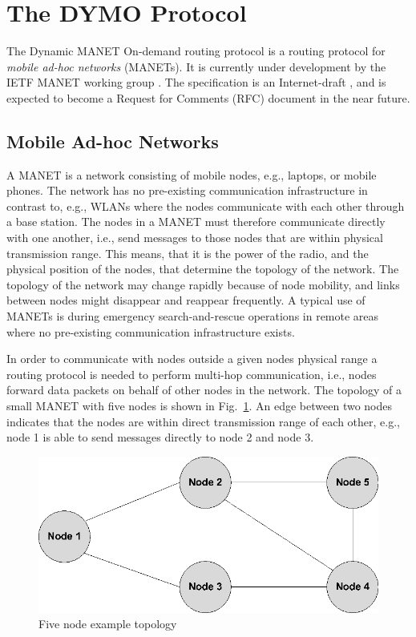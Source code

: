 \section{The DYMO Protocol}
\label{sec:dymooverview}
The Dynamic MANET On-demand routing protocol is a routing protocol for \emph{mobile ad-hoc networks} (MANETs). It is currently under development by the IETF MANET working group \cite{RefWorks:89}. The specification is an Internet-draft \cite{RefWorks:88}, and is expected to become a Request for Comments (RFC) document in the near future.

\subsection{Mobile Ad-hoc Networks}
A MANET \cite{RefWorks:90} is a network consisting of mobile nodes, e.g., laptops, or mobile phones. The network has no pre-existing communication infrastructure in contrast to, e.g., WLANs where the nodes communicate with each other through a base station. The nodes in a MANET must therefore communicate directly with one another, i.e., send messages to those nodes that are within physical transmission range. This means, that it is the power of the radio, and the physical position of the nodes, that determine the topology of the network. The topology of the network may change rapidly because of node mobility, and links between nodes might disappear and reappear frequently. A typical use of MANETs is during emergency search-and-rescue operations in remote areas where no pre-existing communication infrastructure exists. 

\newpage

In order to communicate with nodes outside a given nodes physical range a routing protocol is needed to perform multi-hop communication, i.e., nodes forward data packets on behalf of other nodes in the network. The topology of a small MANET with five nodes is shown in Fig.~\ref{fig:topology}. An edge between two nodes indicates that the nodes are within direct transmission range of each other, e.g., node 1 is able to send messages directly to node 2 and node 3. 

\begin{figure}
\centering
\includegraphics[scale=0.8]{dymo/graphics/topology_ex.eps}
\caption{Five node example topology}
\label{fig:topology}
\end{figure}

